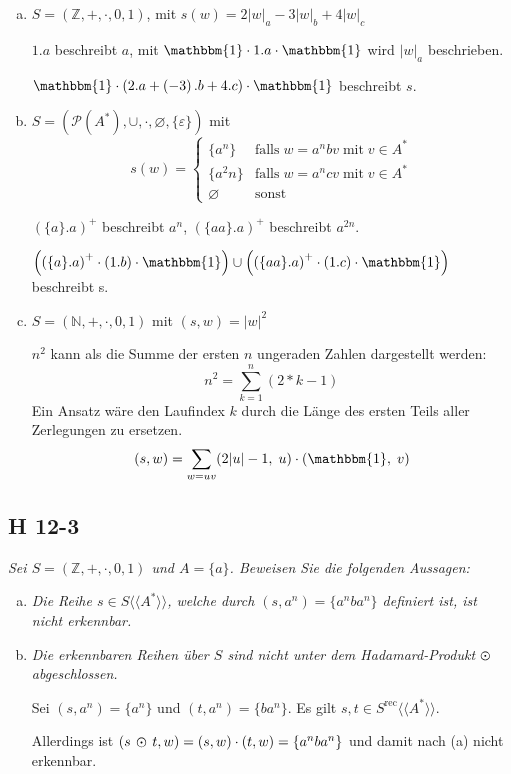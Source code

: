 \documentclass{scrartcl}
\begin{document}
\begin{enumerate}[(a)]
    \item $S = (\mathbb{Z}, +, \cdot, 0, 1)$, mit $s(w) = 2|w|_a -3|w|_b + 4|w|_c$

      $1.a$ beschreibt $a$, mit $\mathbbm{1} \cdot 1.a \cdot \mathbbm{1}$ wird $|w|_a$ beschrieben.

      $\mathbbm{1} \cdot \left(2.a + \left(-3\right).b + 4.c\right) \cdot \mathbbm{1}$ beschreibt $s$.

    \item $S = (\mathcal{P}(A^*), \cup, \cdot, \varnothing, \{\varepsilon\})$ mit
      \begin{equation*}
        s(w) = \begin{cases}
          \{a^n\}     &\text{falls}\;w = a^nbv\;\text{mit}\;v \in A^*\\
          \{a^2n\}    &\text{falls}\;w=a^ncv\;\text{mit}\;v \in A^*\\
          \varnothing &\text{sonst}
        \end{cases}
      \end{equation*}

      $(\{a\}.a)^+$ beschreibt $a^n$, $(\{aa\}.a)^+$ beschreibt $a^{2n}$.

      $\left(\left(\{a\}.a\right)^+ \cdot \left(1.b\right) \cdot \mathbbm{1}\right) \cup \left(\left(\{aa\}.a\right)^+ \cdot \left(1.c\right) \cdot \mathbbm{1}\right)$ beschreibt s.

    \item $S = (\mathbb{N}, +, \cdot, 0, 1)$ mit $(s, w) = |w|^2$

    $n^2$ kann als die Summe der ersten $n$ ungeraden Zahlen dargestellt werden:
    $$
    n^2 = \sum^n_{k=1} (2*k-1)
    $$
    Ein Ansatz wäre den Laufindex $k$ durch die Länge des ersten Teils aller Zerlegungen zu ersetzen.
    \begin{align*}
      (s, w) = \sum_{w=uv} (2|u|-1,\;u)\cdot(\mathbbm{1},\;v)
    \end{align*}
\end{enumerate}

\subsection{H 12-3}

\textsl{Sei $S = (\mathbb{Z}, +, \cdot, 0, 1)$ und $A = \{a\}$. Beweisen Sie die folgenden Aussagen:}

\begin{enumerate}[(a)]
    \item \textsl{Die Reihe $s \in S\langle\langle A^* \rangle\rangle$, welche durch $(s, a^n) = \{a^nba^n\}$ definiert ist, ist nicht erkennbar.}

    \item \textsl{Die erkennbaren Reihen über $S$ sind nicht unter dem Hadamard-Produkt $\varodot$ abgeschlossen.}

      Sei $(s, a^n) = \{a^n\}$ und $(t, a^n) = \{ba^n\}$. Es gilt $s, t \in S^{\text{rec}}\langle\langle A^* \rangle\rangle$.

      Allerdings ist $(s\,\varodot\,t, w) = (s, w) \cdot (t, w) = \{a^nba^n\}$ und damit nach (a) nicht erkennbar.
\end{enumerate}
\end{document}
